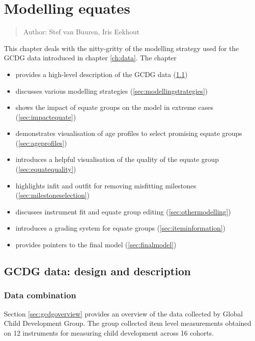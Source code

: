 \documentclass[
]{book}
\providecommand{\tightlist}{%
  \setlength{\itemsep}{0pt}\setlength{\parskip}{0pt}}
\begin{document}
\hypertarget{ch:modellingequates}{%
\chapter{Modelling equates}\label{ch:modellingequates}}

\begin{quote}
Author: Stef van Buuren, Iris Eekhout
\end{quote}

This chapter deals with the nitty-gritty of the modelling strategy used for the GCDG data introduced in chapter \ref{ch:data}. The chapter

\begin{itemize}
\tightlist
\item
  provides a high-level description of the GCDG data (\ref{sec:gcdgdata})
\item
  discusses various modelling strategies (\ref{sec:modellingstrategies})
\item
  shows the impact of equate groups on the model in extreme cases (\ref{sec:impactequate})
\item
  demonstrates visualisation of age profiles to select promising equate groups (\ref{sec:ageprofiles})
\item
  introduces a helpful visualisation of the quality of the equate group (\ref{sec:equatequality})
\item
  highlights infit and outfit for removing misfitting milestones (\ref{sec:milestoneselection})
\item
  discusses instrument fit and equate group editing (\ref{sec:othermodelling})
\item
  introduces a grading system for equate groups (\ref{sec:iteminformation})
\item
  provides pointers to the final model (\ref{sec:finalmodel})
\end{itemize}

\hypertarget{sec:gcdgdata}{%
\section{GCDG data: design and description}\label{sec:gcdgdata}}

\hypertarget{data-combination}{%
\subsection{Data combination}\label{data-combination}}

Section \ref{sec:gcdgoverview} provides an overview of the data collected by Global Child Development Group. The group collected item level measurements obtained on 12 instruments for measuring child development across 16 cohorts.
\end{document}
